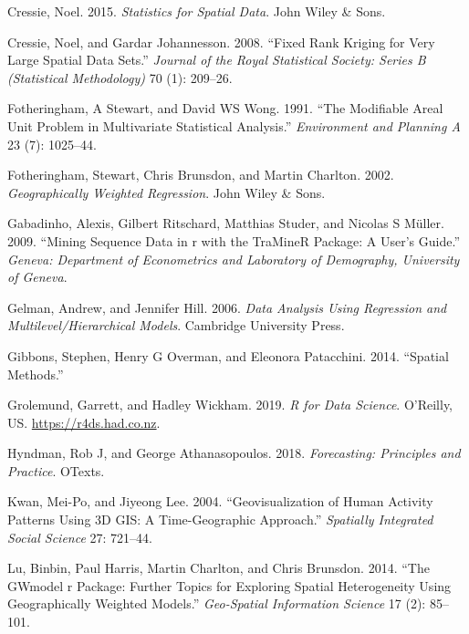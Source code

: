 \documentclass[
  letterpaper,
  krantz2]{style/krantz}
\newlength{\cslhangindent}
\newlength{\cslentryspacingunit} %
\newenvironment{CSLReferences}[2] %
 {%
  \setlength{\parindent}{0pt}
  \ifodd #1
  \let\oldpar\par
  \def\par{\hangindent=\cslhangindent\oldpar}
  \fi
  \setlength{\parskip}{#2\cslentryspacingunit}
 }%
 {}
\begin{document}
\begin{CSLReferences}{1}{0}
\leavevmode{}%
Cressie, Noel. 2015. \emph{Statistics for Spatial Data}. John Wiley \&
Sons.

\leavevmode{}%
Cressie, Noel, and Gardar Johannesson. 2008. {``Fixed Rank Kriging for
Very Large Spatial Data Sets.''} \emph{Journal of the Royal Statistical
Society: Series B (Statistical Methodology)} 70 (1): 209--26.

\leavevmode{}%
Fotheringham, A Stewart, and David WS Wong. 1991. {``The Modifiable
Areal Unit Problem in Multivariate Statistical Analysis.''}
\emph{Environment and Planning A} 23 (7): 1025--44.

\leavevmode{}%
Fotheringham, Stewart, Chris Brunsdon, and Martin Charlton. 2002.
\emph{Geographically Weighted Regression}. John Wiley \& Sons.

\leavevmode{}%
Gabadinho, Alexis, Gilbert Ritschard, Matthias Studer, and Nicolas S
Müller. 2009. {``Mining Sequence Data in r with the TraMineR Package: A
User's Guide.''} \emph{Geneva: Department of Econometrics and Laboratory
of Demography, University of Geneva}.

\leavevmode{}%
Gelman, Andrew, and Jennifer Hill. 2006. \emph{Data Analysis Using
Regression and Multilevel/Hierarchical Models}. Cambridge University
Press.

\leavevmode{}%
Gibbons, Stephen, Henry G Overman, and Eleonora Patacchini. 2014.
{``Spatial Methods.''}

\leavevmode{}%
Grolemund, Garrett, and Hadley Wickham. 2019. \emph{R for Data Science}.
O'Reilly, US. \url{https://r4ds.had.co.nz}.

\leavevmode{}%
Hyndman, Rob J, and George Athanasopoulos. 2018. \emph{Forecasting:
Principles and Practice}. OTexts.

\leavevmode{}%
Kwan, Mei-Po, and Jiyeong Lee. 2004. {``Geovisualization of Human
Activity Patterns Using 3D GIS: A Time-Geographic Approach.''}
\emph{Spatially Integrated Social Science} 27: 721--44.

\leavevmode{}%
Lu, Binbin, Paul Harris, Martin Charlton, and Chris Brunsdon. 2014.
{``The GWmodel r Package: Further Topics for Exploring Spatial
Heterogeneity Using Geographically Weighted Models.''} \emph{Geo-Spatial
Information Science} 17 (2): 85--101.


\end{CSLReferences}
\end{document}
